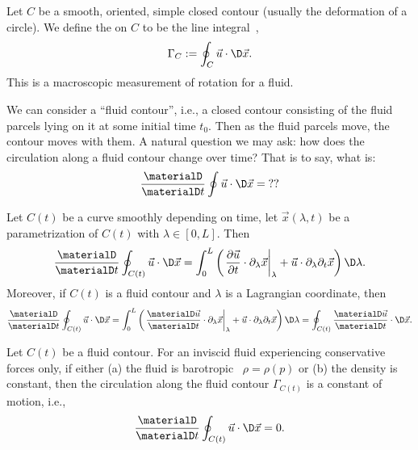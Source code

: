 \begin{node}
\begin{definition}\label{fluids:euler-flow-000V}%
Let $C$ be a smooth, oriented, simple closed contour (usually the
deformation of a circle). We define the  on $C$
to be the line integral~,
\begin{equation*}
\Gamma_{C} := \oint_{C}\vec{u}\cdot\D\vec{x}.
\end{equation*}
This is a macroscopic measurement of rotation for a fluid.
\end{definition}

\begin{node}\label{fluids:euler-flow-000W}%
We can consider a ``fluid contour'', i.e., a closed contour consisting
of the fluid parcels lying on it at some initial time $t_{0}$. Then as 
the fluid parcels move, the contour moves with them. A natural question
we may ask: how does the circulation along a fluid contour change over
time? That is to say, what is:
\begin{equation*}
\frac{\materialD}{\materialD t}\oint\vec{u}\cdot\D\vec{x}=\mbox{??}
\end{equation*}

\begin{lemma}\label{fluids:euler-flow-0012}%
Let $C(t)$ be a curve smoothly depending on time, let
$\vec{x}(\lambda,t)$ be a parametrization of $C(t)$ with $\lambda\in[0,L]$.
Then
\begin{equation*}
\frac{\materialD}{\materialD t}\oint_{C(t)}\vec{u}\cdot\D\vec{x}
=\int^{L}_{0}\left(\left.\frac{\partial\vec{u}}{\partial t}\cdot\partial_{\lambda}\vec{x}\right|_{\lambda}+\vec{u}\cdot\partial_{\lambda}\partial_{t}\vec{x}\right)\D\lambda.
\end{equation*}
Moreover, if $C(t)$ is a fluid contour and $\lambda$ is a Lagrangian
coordinate, then
\begin{equation*}
\frac{\materialD}{\materialD t}\oint_{C(t)}\vec{u}\cdot\D\vec{x}
=\int^{L}_{0}\left(\left.\frac{\materialD\vec{u}}{\materialD t}\cdot\partial_{\lambda}\vec{x}\right|_{\lambda}+\vec{u}\cdot\partial_{\lambda}\partial_{t}\vec{x}\right)\D\lambda=\oint_{C(t)}\frac{\materialD\vec{u}}{\materialD t}\cdot\D\vec{x}.
\end{equation*}
\end{lemma}

\begin{theorem}[Kelvin]\label{fluids:euler-flow-0013}%
Let $C(t)$ be a fluid contour. For an inviscid fluid experiencing
conservative forces only, if either (a) the fluid is barotropic~
$\rho=\rho(p)$ or (b) the density is constant, then the circulation
along the fluid contour $\Gamma_{C(t)}$ is a constant of motion, i.e.,
\begin{equation*}
\frac{\materialD}{\materialD t}\oint_{C(t)}\vec{u}\cdot\D\vec{x}=0.
\end{equation*}
\end{theorem}


\end{node}
\end{node}
